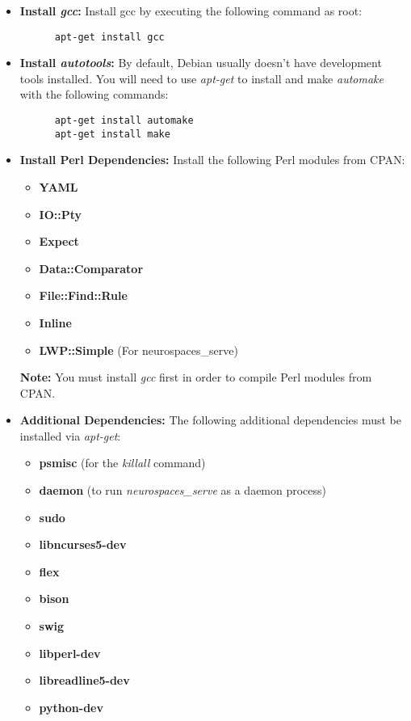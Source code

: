 \documentclass[12pt]{article}
\begin{document}
\begin{itemize}
   \item[]{\bf Install {\it gcc}:} Install gcc by executing the following command as root:
   \begin{verbatim}
      apt-get install gcc
   \end{verbatim}
   
   \item[]{\bf Install {\it autotools}:} By default, Debian usually doesn't have development tools installed. You will need to use {\it apt-get} to install and make {\it automake} with the following commands:
   \begin{verbatim}
      apt-get install automake 
      apt-get install make
   \end{verbatim}
   
   \item[]{\bf Install Perl Dependencies:} Install the following Perl modules from CPAN:
     \begin{itemize}
        \item[]{\bf YAML}
        \item[]{\bf IO::Pty}
        \item[]{\bf Expect}
        \item[]{\bf Data::Comparator}
        \item[]{\bf File::Find::Rule}
        \item[]{\bf Inline}
		\item[]{\bf LWP::Simple} (For neurospaces\_serve)
     \end{itemize}
     {\bf Note:} You must install {\it gcc} first in order to compile Perl modules from CPAN.     

   \item[]{\bf Additional Dependencies:} The following additional dependencies must be installed via {\it apt-get}:
     \begin{itemize}
        \item[]{\bf psmisc} (for the {\it killall} command)
        \item[]{\bf daemon} (to run {\it neurospaces\_serve} as a daemon process)
        \item[]{\bf sudo}
        \item[]{\bf libncurses5-dev}
        \item[]{\bf flex}
        \item[]{\bf bison}
        \item[]{\bf swig}
        \item[]{\bf libperl-dev}
        \item[]{\bf libreadline5-dev}
        \item[]{\bf python-dev}
     \end{itemize}
\end{itemize}
\end{document}
